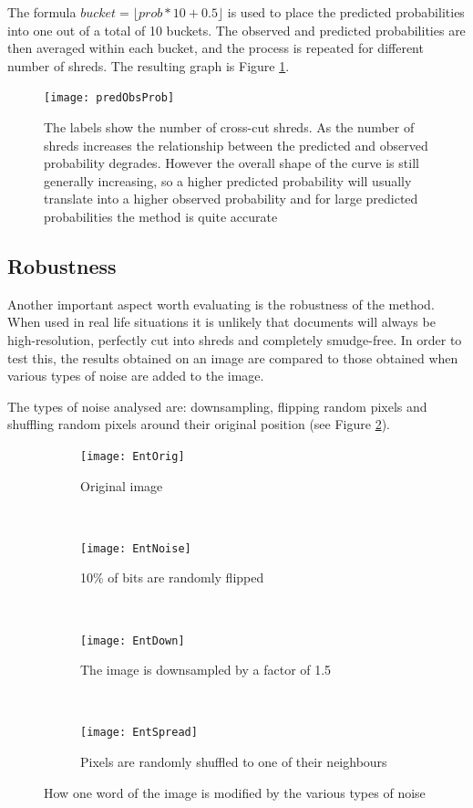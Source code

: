 The formula $bucket = \lfloor prob * 10 + 0.5\rfloor$ is used to place the predicted probabilities into one out of a total of 10 buckets. The observed and predicted probabilities are then averaged within each bucket, and the process is repeated for different number of shreds. The resulting graph is Figure \ref{fig:probComp}.
\begin{figure}[h]
\centering
\texttt{[image: predObsProb]}
\caption{The labels show the number of cross-cut shreds. As the number of shreds increases the relationship between the predicted and observed probability degrades. However the overall shape of the curve is still generally increasing, so a higher predicted probability will usually translate into a higher observed probability and for large predicted probabilities the method is quite accurate}
\label{fig:probComp}
\end{figure}

\subsection{Robustness}
\label{chap4Rob}
Another important aspect worth evaluating is the robustness of the method. When used in real life situations it is unlikely that documents will always be high-resolution, perfectly cut into shreds and completely smudge-free. In order to test this, the results obtained on an image are compared to those obtained when various types of noise are added to the image. 

The types of noise analysed are: downsampling, flipping random pixels and shuffling random pixels around their original position (see Figure \ref{fig:noiseTypes}). 

\begin{figure}[H]
        \centering
        \begin{subfigure}[b]{0.4\textwidth}
                \centering
                \texttt{[image: EntOrig]}
                \caption{Original image}
        \end{subfigure}
        ~ 
        \begin{subfigure}[b]{0.4\textwidth}
                \centering
                \texttt{[image: EntNoise]}
                \caption{10\% of bits are randomly flipped}
        \end{subfigure}
        ~ 
        \begin{subfigure}[b]{0.4\textwidth}
                \centering
                \texttt{[image: EntDown]}
                \caption{The image is downsampled by a factor of 1.5}
        \end{subfigure}
        ~ 
        \begin{subfigure}[b]{0.4\textwidth}
                \centering
                \texttt{[image: EntSpread]}
                \caption{Pixels are randomly shuffled to one of their neighbours}
        \end{subfigure}
        \caption{How one word of the image is modified by the various types of noise}
        \label{fig:noiseTypes}
\end{figure}

